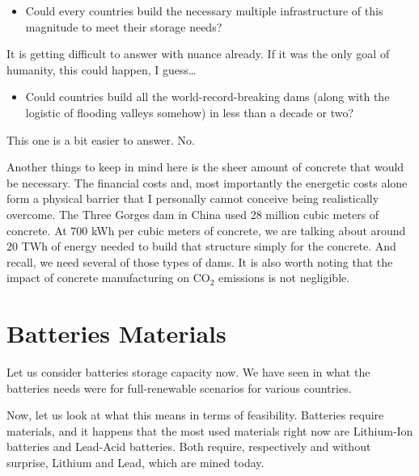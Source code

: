 \begin{itemize}
\item Could every countries build the necessary multiple infrastructure of this magnitude to meet their storage needs?
\end{itemize}

It is getting difficult to answer with nuance already. If it was the only goal of humanity, this could happen, I guess\ldots


\begin{itemize}
\item Could countries build all the world-record-breaking dams (along with the logistic of flooding valleys somehow) in less than a decade or two?
\end{itemize}

This one is a bit easier to answer. No.


Another things to keep in mind here is the sheer amount of concrete that would be necessary. The financial costs and, most importantly the energetic costs alone form a physical barrier that I personally cannot conceive being realistically overcome. The Three Gorges dam in China used 28 million cubic meters of concrete. At 700 kWh per cubic meters of concrete, we are talking about around 20 TWh of energy needed to build that structure simply for the concrete. And recall, we need several of those types of dams. It is also worth noting that the impact of concrete manufacturing on $\mathrm{CO_2}$ emissions is not negligible.





\section{Batteries Materials}

Let us consider batteries storage capacity now. We have seen in  what the batteries needs were for full-renewable scenarios for various countries.

Now, let us look at what this means in terms of feasibility. Batteries require materials, and it happens that the most used materials right now are Lithium-Ion batteries and Lead-Acid batteries. Both require, respectively and without surprise, Lithium and Lead, which are mined today. 

